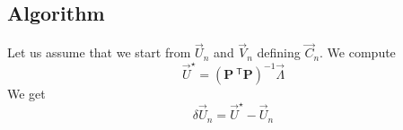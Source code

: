 \documentclass[aps]{revtex4}
\newcommand{\mymat}[1]{\bm{#1}}
\newcommand{\mytrn}[1]{~^{\mathsf{T}}{#1}}
\begin{document}
\subsection{Algorithm}
Let us assume that we start from $\vec{U}_n$ and $\vec{V}_n$ defining $\vec{C}_n$.
We compute
\begin{equation}
\vec{U}^\star = \left(\mymat{P}\mytrn{\mymat{P}}\right)^{-1} \vec{\Lambda}
\end{equation}
We get
\begin{equation}
	\delta\vec{U}_n = \vec{U}^\star - \vec{U}_n
\end{equation}
\end{document}
